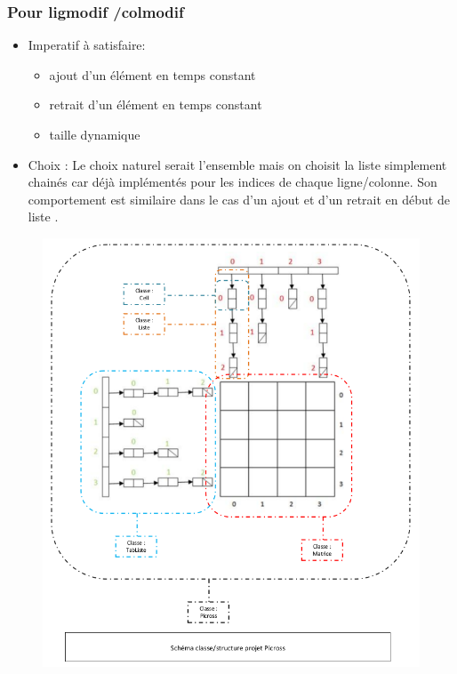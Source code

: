 \documentclass{article}
\begin{document}
\subsubsection{Pour ligmodif /colmodif}
\begin{itemize}
\item Imperatif à satisfaire:
\begin{itemize}
\item ajout d'un élément en temps constant
\item retrait d'un élément en temps constant
\item taille dynamique
\end{itemize}
\item Choix :
Le choix naturel serait l'ensemble mais on choisit la liste simplement chainés car déjà  implémentés pour les indices de chaque ligne/colonne. Son
comportement est similaire dans le cas d'un ajout et d'un retrait en début de liste .
\end{itemize}
\begin{landscape}
\begin{figure}
\begin{center}
\includegraphics[width=14cm]{./images/recapitulatif_stucture.png}
\end{center}
\end{figure}
\end{landscape}
\newpage
\end{document}

